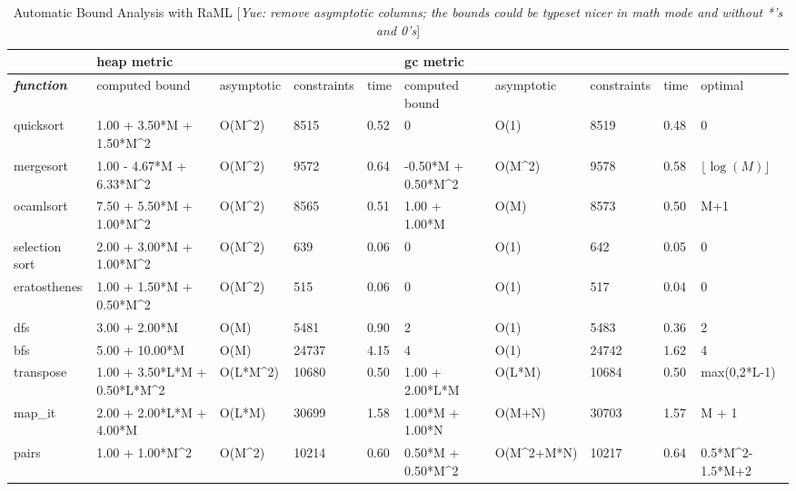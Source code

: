 \documentclass{easychair}
\newcounter{rule}
\newcommand{\yue}[1]{{\color{blue} [\emph{Yue: #1}]}}
\theoremstyle{definition}
\begin{document}
\begin{table}[]
	\begin{adjustbox}{width=1.1\textwidth,center=\textwidth}
  \begin{tabular}{@{}llllllllll@{}}
		\toprule
		 & \multicolumn{4}{l}{heap metric} & \multicolumn{4}{l}{gc metric} &  \\ \midrule
		 \textit{\textbf{function}} & computed bound & asymptotic & constraints & time & computed bound & asymptotic & constraints & time & optimal \\
		 quicksort & 1.00 + 3.50*M + 1.50*M\textasciicircum{}2 & O(M\textasciicircum{}2) & 8515 & 0.52 & 0 & O(1) & 8519 & 0.48 & 0 \\
		 mergesort & 1.00 - 4.67*M + 6.33*M\textasciicircum{}2 & O(M\textasciicircum{}2) & 9572 & 0.64 & -0.50*M + 0.50*M\textasciicircum{}2 & O(M\textasciicircum{}2) & 9578 & 0.58 & $\lfloor \log(M) \rfloor$ \\
		 ocamlsort & 7.50 + 5.50*M + 1.00*M\textasciicircum{}2 & O(M\textasciicircum{}2) & 8565 & 0.51 & 1.00 + 1.00*M & O(M) & 8573 & 0.50 & M+1 \\
		 selection sort & 2.00 + 3.00*M + 1.00*M\textasciicircum{}2 & O(M\textasciicircum{}2) & 639 & 0.06 & 0 & O(1) & 642 & 0.05 & 0 \\
		 eratosthenes & 1.00 + 1.50*M + 0.50*M\textasciicircum{}2 & O(M\textasciicircum{}2) & 515 & 0.06 & 0 & O(1) & 517 & 0.04 & 0 \\
		 dfs & 3.00 + 2.00*M & O(M) & 5481 & 0.90 & 2 & O(1) & 5483 & 0.36 & 2 \\
		 bfs & 5.00 + 10.00*M & O(M) & 24737 & 4.15 & 4 & O(1) & 24742 & 1.62 & 4 \\
		 transpose & 1.00 + 3.50*L*M + 0.50*L*M\textasciicircum{}2 & O(L*M\textasciicircum{}2) & 10680 & 0.50 & 1.00 + 2.00*L*M & O(L*M) & 10684 & 0.50 & max(0,2*L-1) \\
		 map\_it & 2.00 + 2.00*L*M + 4.00*M & O(L*M) & 30699 & 1.58 & 1.00*M + 1.00*N & O(M+N) & 30703 & 1.57 & M + 1 \\
		 pairs & 1.00 + 1.00*M\textasciicircum{}2 & O(M\textasciicircum{}2) & 10214 & 0.60 & 0.50*M + 0.50*M\textasciicircum{}2 & O(M\textasciicircum{}2+M*N) & 10217 & 0.64 & 0.5*M\textasciicircum{}2-1.5*M+2 \\ \midrule
	\end{tabular}
	\end{adjustbox}
\caption{Automatic Bound Analysis with RaML \yue{remove asymptotic columns; the bounds could be typeset nicer in math mode and without *'s and 0's}}
\label{table:bounds}
\end{table}
\end{document}
